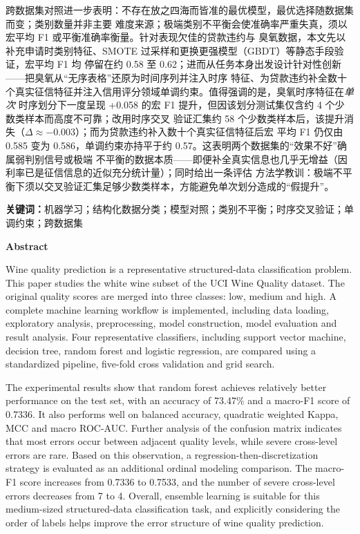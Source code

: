 \documentclass[12pt,a4paper,fontset=fandol]{ctexart}
\numberwithin{figure}{section}
\numberwithin{table}{section}
\numberwithin{equation}{section}
\begin{document}
\par 跨数据集对照进一步表明：不存在放之四海而皆准的最优模型，最优选择随数据集而变；类别数量并非主要
难度来源；极端类别不平衡会使准确率严重失真，须以宏平均 F1 或平衡准确率衡量。针对表现欠佳的贷款违约与
臭氧数据，本文先以补充申请时类别特征、SMOTE 过采样和更换更强模型（GBDT）等静态手段验证，宏平均 F1 均
停留在约 0.58 至 0.62；进而从任务本身出发设计针对性创新——把臭氧从“无序表格”还原为时间序列并注入时序
特征、为贷款违约补全数十个真实征信特征并注入信用评分领域单调约束。值得强调的是，臭氧时序特征在\emph{单次}
时序划分下一度呈现 +0.058 的宏 F1 提升，但因该划分测试集仅含约 4 个少数类样本而高度不可靠；改用时序交叉
验证汇集约 58 个少数类样本后，该提升消失（$\Delta\approx-0.003$）；而为贷款违约补入数十个真实征信特征后宏
平均 F1 仍仅由 0.585 变为 0.586，单调约束亦持平于约 0.57。这表明两个数据集的“效果不好”确属弱判别信号或极端
不平衡的数据本质——即便补全真实信息也几乎无增益（因利率已是征信信息的近似充分统计量）；同时给出一条评估
方法学教训：极端不平衡下须以交叉验证汇集足够少数类样本，方能避免单次划分造成的“假提升”。

\par\vspace{1ex}
\noindent\textbf{关键词：}机器学习；结构化数据分类；模型对照；类别不平衡；时序交叉验证；单调约束；跨数据集

\newpage
\begin{center}{\Large\bfseries Abstract}\end{center}
\par Wine quality prediction is a representative structured-data classification problem. This paper studies the
white wine subset of the UCI Wine Quality dataset. The original quality scores are merged into three classes:
low, medium and high. A complete machine learning workflow is implemented, including data loading, exploratory
analysis, preprocessing, model construction, model evaluation and result analysis. Four representative classifiers,
including support vector machine, decision tree, random forest and logistic regression, are compared using a
standardized pipeline, five-fold cross validation and grid search.

\par The experimental results show that random forest achieves relatively better performance on the test set, with
an accuracy of 73.47\% and a macro-F1 score of 0.7336. It also performs well on balanced accuracy, quadratic
weighted Kappa, MCC and macro ROC-AUC. Further analysis of the confusion matrix indicates that most errors occur
between adjacent quality levels, while severe cross-level errors are rare. Based on this observation, a
regression-then-discretization strategy is evaluated as an additional ordinal modeling comparison. The macro-F1
score increases from 0.7336 to 0.7533, and the number of severe cross-level errors decreases from 7 to 4. Overall,
ensemble learning is suitable for this medium-sized structured-data classification task, and explicitly considering
the order of labels helps improve the error structure of wine quality prediction.
\end{document}

